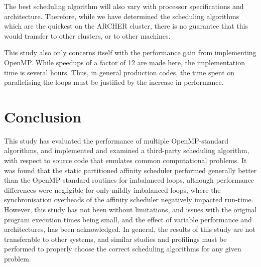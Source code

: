 \documentclass{article} %
\begin{document}
The best scheduling algorithm will also vary with processor specifications and architecture.
Therefore, while we have determined the scheduling algorithms which are the quickest on the ARCHER cluster, there is no guarantee that this would transfer to other clusters, or to other machines.

This study also only concerns itself with the performance gain from implementing OpenMP.
While speedups of a factor of 12 are made here, the implementation time is several hours.
Thus, in general production codes, the time spent on parallelising the loops must be justified by the increase in performance.

\section*{Conclusion}

This study has evaluated the performance of multiple OpenMP-standard algorithms, and implemented and examined a third-party scheduling algorithm, with respect to source code that emulates common computational problems.
It was found that the static partitioned affinity scheduler performed generally better than the OpenMP-standard routines for imbalanced loops, although performance differences were negligible for only mildly imbalanced loops, where the synchronisation overheads of the affinity scheduler negatively impacted run-time.
However, this study has not been without limitations, and issues with the original program execution times being small, and the effect of variable performance and architectures, has been acknowledged.
In general, the results of this study are not transferable to other systems, and similar studies and profilings must be performed to properly choose the correct scheduling algorithms for any given problem.



\newpage

\end{document}
